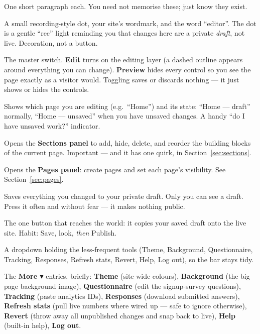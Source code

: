 \documentclass[11pt]{article}
\begin{document}
One short paragraph each. You need not memorise these; just know they exist.

\begin{description}[style=nextline,leftmargin=1.4em]
  \item[The brand corner] A small recording-style dot, your site's wordmark, and the
    word ``editor''. The dot is a gentle ``rec'' light reminding you that changes here
    are a private \emph{draft}, not live. Decoration, not a button.
  \item[Edit / Preview] The master switch. \textbf{Edit} turns on the editing layer
    (a dashed outline appears around everything you can change). \textbf{Preview}
    hides every control so you see the page exactly as a visitor would. Toggling saves
    or discards nothing --- it just shows or hides the controls.
  \item[The page pill] Shows which page you are editing (e.g.\ ``Home'') and its state:
    ``Home --- draft'' normally, ``Home --- unsaved'' when you have unsaved changes. A
    handy ``do I have unsaved work?'' indicator.
  \item[Sections] Opens the \textbf{Sections panel} to add, hide, delete, and reorder
    the building blocks of the current page. Important --- and it has one quirk, in
    Section~\ref{sec:sections}.
  \item[Pages] Opens the \textbf{Pages panel}: create pages and set each page's
    visibility. See Section~\ref{sec:pages}.
  \item[Save draft] Saves everything you changed to your private draft. Only you can
    see a draft. Press it often and without fear --- it makes nothing public.
  \item[Publish] The one button that reaches the world: it copies your saved draft
    onto the live site. Habit: Save, look, \emph{then} Publish.
  \item[More $\blacktriangledown$] A dropdown holding the less-frequent tools (Theme, Background,
    Questionnaire, Tracking, Responses, Refresh stats, Revert, Help, Log out), so the
    bar stays tidy.
\end{description}

\noindent The \textbf{More $\blacktriangledown$} entries, briefly: \textbf{Theme} (site-wide colours),
\textbf{Background} (the big page background image), \textbf{Questionnaire} (edit the
signup-survey questions), \textbf{Tracking} (paste analytics IDs), \textbf{Responses}
(download submitted answers), \textbf{Refresh stats} (pull live numbers where wired
up --- safe to ignore otherwise), \textbf{Revert} (throw away all unpublished changes
and snap back to live), \textbf{Help} (built-in help), \textbf{Log out}.
\end{document}
